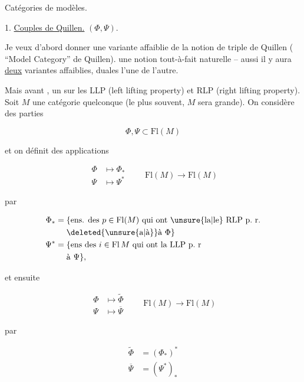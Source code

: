

Catégories de modèles.

1. \uline{Couples de Quillen.} $(\Phi,\Psi)$.

Je veux d'abord donner une variante affaiblie de la notion de triple de Quillen ( ``Model Category'' de Quillen).     une notion tout-à-fait naturelle -- aussi il y aura \uline{deux} variantes affaiblies, duales l'une de l'autre.

Mais avant , un  sur les LLP (left lifting property) et RLP (right lifting property). Soit $M$ une catégorie quelconque (le plus souvent, $M$ sera grande). On considère des parties


\[ \Phi,\Psi\subset\mathrm{Fl}(M) \]

et on définit des applications

\[ \boxed{\begin{aligned}\Phi&\longmapsto\Phi_*\\ \Psi&\longmapsto\Psi^*\end{aligned}}\qquad \mathrm{Fl}(M)\longrightarrow\mathrm{Fl}(M) \]

par

\[ \begin{aligned}\Phi_*={}&\{\text{ens. des }p\in\mathrm{Fl}(M)\text{ qui ont \unsure{la|le} RLP p.~r.}\\ &\deleted{\unsure{\text{a}|\text{à}}}\text{à }\Phi\}\\
\Psi^*={}&\{\text{ens des }i\in\mathrm{Fl}\,M\text{ qui ont la LLP p.~r}\\ &\text{à }\Psi\},\end{aligned} \]

et ensuite

\[ \boxed{\begin{aligned}\Phi&\longmapsto\widetilde\Phi\\ \Psi&\longmapsto\overline\Psi\end{aligned}}\qquad \mathrm{Fl}(M)\to\mathrm{Fl}(M) \]

par

\[ \begin{aligned}\widetilde\Phi&=(\Phi_*)^*\\ \overline\Psi&=(\Psi^*)_*\end{aligned} \]


